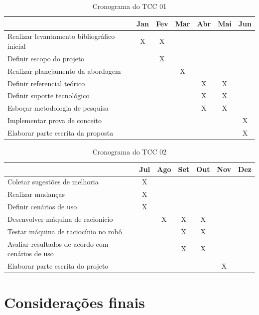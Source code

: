 \FloatBarrier
\begin{table}[h]
	\centering
	
	\begin{tabular}{lcccccc}
		\toprule
		& \textbf{Jan} & \textbf{Fev} & \textbf{Mar} & \textbf{Abr} & \textbf{Mai} & 		
		\textbf{Jun} \\
		\midrule
		Realizar levantamento bibliográfico inicial & X & X &  &  &  &  \\
		\midrule
		Definir escopo do projeto &  & X &  &  &  &  \\
		\midrule
		Realizar planejamento da abordagem &  &  & X &  &  &  \\
		\midrule
		Definir referencial teórico &  &  &  & X & X &  \\
		\midrule
		Definir suporte tecnológico &  &  &  & X & X &  \\
		\midrule
		Esboçar metodologia de pesquisa &  &  &  & X & X &  \\
		\midrule
		Implementar prova de conceito &  &  &  &  &  & X \\
		\midrule
		Elaborar parte escrita da proposta &  &  &  &  &  & X \\
		\bottomrule
	\end{tabular}

	\caption{Cronograma do TCC 01}
	\label{tab01}
\end{table}

\FloatBarrier
\begin{table}[h]
	\centering
	
	\begin{tabular}{lcccccc}
		\toprule
		& \textbf{Jul} & \textbf{Ago} & \textbf{Set} & \textbf{Out} & \textbf{Nov} & 		
		\textbf{Dez} \\
		\midrule
		Coletar sugestões de melhoria & X &  &  &  &  &  \\
		\midrule
		Realizar mudanças & X &  &  &  &  &  \\
		\midrule
		Definir cenários de uso & X &  &  &  &  &  \\
		\midrule
		Desenvolver máquina de racionício &  & X & X & X &  &  \\
		\midrule
		Testar máquina de raciocínio no robô &  &  & X & X &  &  \\
		\midrule
		Avaliar resultados de acordo com cenários de uso &  &  & X & X &  &  \\
		\midrule
		Elaborar parte escrita do projeto &  &  &  &  & X &  \\
		\bottomrule
	\end{tabular}

	\caption{Cronograma do TCC 02}
	\label{tab02}
\end{table}
\section{Considerações finais}